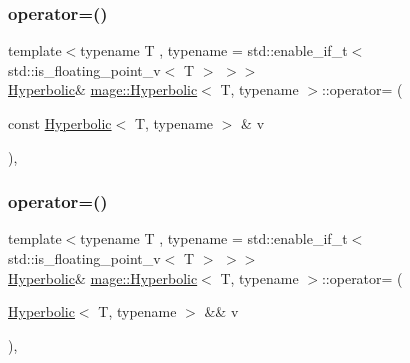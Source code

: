\subsubsection{\texorpdfstring{operator=()}{operator=()}\hspace{0.1cm}{\footnotesize\ttfamily [1/2]}}
{\footnotesize\ttfamily template$<$typename T , typename  = std\+::enable\+\_\+if\+\_\+t$<$ std\+::is\+\_\+floating\+\_\+point\+\_\+v$<$ T $>$ $>$$>$ \\
\mbox{\hyperlink{structmage_1_1_hyperbolic}{Hyperbolic}}\& \mbox{\hyperlink{structmage_1_1_hyperbolic}{mage\+::\+Hyperbolic}}$<$ T, typename $>$\+::operator= (\begin{DoxyParamCaption}\item[{const \mbox{\hyperlink{structmage_1_1_hyperbolic}{Hyperbolic}}$<$ T, typename $>$ \&}]{v }\end{DoxyParamCaption})\hspace{0.3cm}{\ttfamily [default]}, {\ttfamily [noexcept]}}

\mbox{\label{structmage_1_1_hyperbolic_a81b6e027f2fba1366d562a57e4e954ee}} 
\subsubsection{\texorpdfstring{operator=()}{operator=()}\hspace{0.1cm}{\footnotesize\ttfamily [2/2]}}
{\footnotesize\ttfamily template$<$typename T , typename  = std\+::enable\+\_\+if\+\_\+t$<$ std\+::is\+\_\+floating\+\_\+point\+\_\+v$<$ T $>$ $>$$>$ \\
\mbox{\hyperlink{structmage_1_1_hyperbolic}{Hyperbolic}}\& \mbox{\hyperlink{structmage_1_1_hyperbolic}{mage\+::\+Hyperbolic}}$<$ T, typename $>$\+::operator= (\begin{DoxyParamCaption}\item[{\mbox{\hyperlink{structmage_1_1_hyperbolic}{Hyperbolic}}$<$ T, typename $>$ \&\&}]{v }\end{DoxyParamCaption})\hspace{0.3cm}{\ttfamily [default]}, {\ttfamily [noexcept]}}

\mbox{\label{structmage_1_1_hyperbolic_a27b3be8e8a691994681805d86501b152}} 
